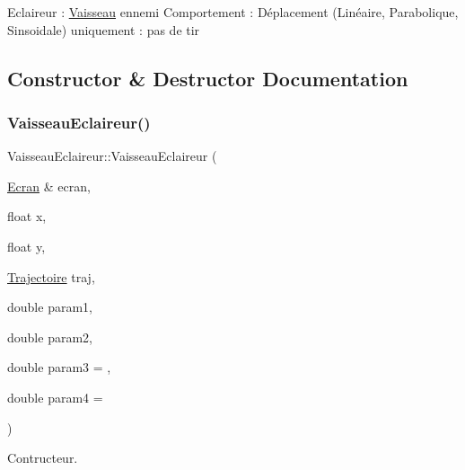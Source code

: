 Eclaireur \+: \mbox{\hyperlink{class_vaisseau}{Vaisseau}} ennemi Comportement \+: Déplacement (Linéaire, Parabolique, Sinsoidale) uniquement \+: pas de tir 

\subsection{Constructor \& Destructor Documentation}
\mbox{\label{class_vaisseau_eclaireur_a3e02d4ef7316d0a44148c785c376deb2}} 
\subsubsection{\texorpdfstring{Vaisseau\+Eclaireur()}{VaisseauEclaireur()}}
{\footnotesize\ttfamily Vaisseau\+Eclaireur\+::\+Vaisseau\+Eclaireur (\begin{DoxyParamCaption}\item[{\mbox{\hyperlink{class_ecran}{Ecran}} \&}]{ecran,  }\item[{float}]{x,  }\item[{float}]{y,  }\item[{\mbox{\hyperlink{_trajectoire_8h_afa7f6e8323d7ee755d93cd1f6019dd95}{Trajectoire}}}]{traj,  }\item[{double}]{param1,  }\item[{double}]{param2,  }\item[{double}]{param3 = {},  }\item[{double}]{param4 = {} }\end{DoxyParamCaption})}



Contructeur. 


